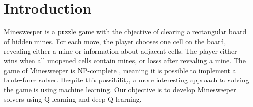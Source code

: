 \section{Introduction}

Minesweeper is a puzzle game with the objective of clearing a rectangular board of hidden mines. 
For each move, the player chooses one cell on the board, revealing either a mine or information about adjacent cells.
The player either wins when all unopened cells contain mines, or loses after revealing a mine.
The game of Minesweeper is NP-complete \cite{kaye}, meaning it is possible to implement a brute-force solver. 
Despite this possibility, a more interesting approach to solving the game is using machine learning.
Our objective is to develop Minesweeper solvers using Q-learning and deep Q-learning.
